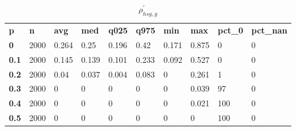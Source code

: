 \begin{table}[h]
 \centering 
\footnotesize
\caption{$\rho_{hsg,g}^\prime $}
\label{tab:alphahsgg}
\begin{tabular}[h]{| l l l l l l l l l l|
    } \hline
\textbf{ p} & \textbf{ n} & \textbf{ avg} & \textbf{ med} & \textbf{ q025} & \textbf{ q975} & \textbf{ min} & \textbf{ max} & \textbf{ pct\_0} & \textbf{ pct\_nan}
           \\
  \textbf{  0} & 2000 & 0.264 &  0.25 & 0.196 &  0.42 & 0.171 & 0.875 &   0 & 0
           \\
  \textbf{0.1} & 2000 & 0.145 & 0.139 & 0.101 & 0.233 & 0.092 & 0.527 &   0 & 0
           \\
  \textbf{0.2} & 2000 &  0.04 & 0.037 & 0.004 & 0.083 &     0 & 0.261 &   1 & 0
           \\
  \textbf{0.3} & 2000 &     0 &     0 &     0 &     0 &     0 & 0.039 &  97 & 0
           \\
  \textbf{0.4} & 2000 &     0 &     0 &     0 &     0 &     0 & 0.021 & 100 & 0
           \\
  \textbf{0.5} & 2000 &     0 &     0 &     0 &     0 &     0 &     0 & 100 & 0
           \\
 \hline \end{tabular}
 \end{table}
